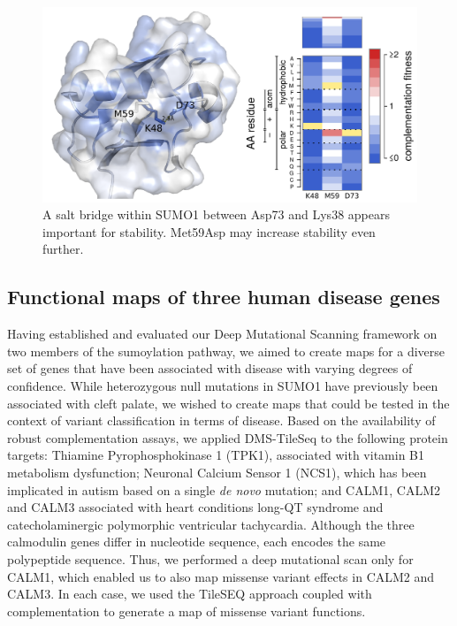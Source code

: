\begin{figure}[h!]
	\centering
	\includegraphics[width=\textwidth]{img/saltbridge.pdf}
	\caption{A salt bridge within SUMO1 between Asp73 and Lys38 appears important for stability. Met59Asp may increase stability even further.}
	\label{fig:saltbridge}
\end{figure}






\subsection{Functional maps of three human disease genes}

Having established and evaluated our Deep Mutational Scanning framework on two members of the sumoylation pathway, we aimed to create maps for a diverse set of genes that have been associated with disease with varying degrees of confidence. While  heterozygous null mutations in SUMO1 have previously been associated with cleft palate, we wished to create maps that could be tested in the context of variant classification in terms of disease. Based on the availability of robust complementation assays, we applied DMS-TileSeq to the following protein targets: Thiamine Pyrophosphokinase 1 (TPK1), associated with vitamin B1 metabolism dysfunction; Neuronal Calcium Sensor 1 (NCS1), which has been implicated in autism based on a single \textit{de novo} mutation;  and CALM1, CALM2 and CALM3 associated with heart conditions long-QT syndrome and catecholaminergic polymorphic ventricular tachycardia. Although the three calmodulin genes differ in nucleotide sequence, each encodes the same polypeptide sequence. Thus, we performed a deep mutational scan only for CALM1, which enabled us to also map missense variant effects in CALM2 and CALM3. In each case, we used the TileSEQ approach coupled with complementation to generate a map of missense variant functions. 

